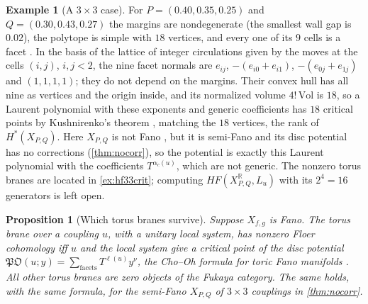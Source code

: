 \documentclass[11pt]{article}
\newtheorem{proposition}[theorem]{Proposition}
\theoremstyle{definition}
\newtheorem{example}[theorem]{Example}
\theoremstyle{remark}
\newcommand{\R}{\mathbb{R}}
\begin{document}
\begin{example}[A $3\times3$ case]\label{ex:hf33}
For $P=(0.40,0.35,0.25)$ and $Q=(0.30,0.43,0.27)$ the margins are nondegenerate (the smallest wall gap is $0.02$), the polytope is simple with
$18$ vertices, and every one of its $9$ cells is a facet \cite[\S6]{Family}. In the basis of the lattice of integer circulations given by the
moves at the cells $(i,j)$, $i,j<2$, the nine facet normals are $e_{ij}$, $-(e_{i0}+e_{i1})$, $-(e_{0j}+e_{1j})$ and $(1,1,1,1)$; they do not depend on the
margins. Their convex hull has all nine as vertices and the origin inside, and its normalized volume $4!\,\mathrm{Vol}$ is $18$, so a Laurent
polynomial with these exponents and generic coefficients has $18$ critical points by Kushnirenko's theorem \cite{Kushnirenko1976}, matching
the $18$ vertices, the rank of $H^*(X_{P,Q})$. Here $X_{P,Q}$ is not Fano \cite[Prop.~6.3]{Family}, but it is semi-Fano and its disc potential has no corrections
(\cref{thm:nocorr}), so the potential is exactly this Laurent polynomial with the coefficients $T^{\alpha_c(u)}$, which are not generic. The
nonzero torus branes are located in \cref{ex:hf33crit}; computing $HF(X^{\R}_{P,Q},L_u)$ with its $2^4=16$ generators is left open.
\end{example}

\begin{proposition}[Which torus branes survive]\label{prop:floer}
Suppose $X_{f,g}$ is Fano. The torus brane over a coupling $u$, with a unitary local system, has nonzero Floer cohomology iff $u$ and the local system give a critical
point of the disc potential $\mathfrak{PO}(u;y)=\sum_{\text{facets}}T^{\ell(u)}y^{\nu}$, the Cho--Oh formula for toric Fano manifolds
\cite{ChoOh2006,FOOO2010}. All other torus branes are zero objects of the Fukaya category. The same holds, with the same formula, for the
semi-Fano $X_{P,Q}$ of $3\times3$ couplings in \cref{thm:nocorr}.
\end{proposition}
\end{document}
